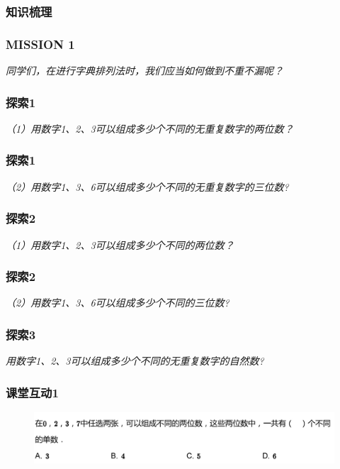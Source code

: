 \begin{frame}
    \frametitle{知识梳理}
\end{frame}

\begin{frame}
    \frametitle{MISSION 1}
    \vspace*{-2cm}
    \textit{同学们，在进行字典排列法时，我们应当如何做到不重不漏呢？}
\end{frame}

\begin{frame}
    \frametitle{探索1}
    \vspace*{-2cm}
    \textit{（1）用数字1、2、3可以组成多少个不同的无重复数字的两位数？}
\end{frame}

\begin{frame}
    \frametitle{探索1}
    \vspace*{-2cm}
    \textit{（2）用数字1、3、6可以组成多少个不同的无重复数字的三位数?}
\end{frame}

\begin{frame}
    \frametitle{探索2}
    \vspace*{-2cm}
    \textit{（1）用数字1、2、3可以组成多少个不同的两位数？}
\end{frame}

\begin{frame}
    \frametitle{探索2}
    \vspace*{-2cm}
    \textit{（2）用数字1、3、6可以组成多少个不同的三位数?}
\end{frame}

\begin{frame}
    \frametitle{探索3}
    \vspace*{-2cm}
    \textit{用数字1、2、3可以组成多少个不同的无重复数字的自然数?}
\end{frame}

\begin{frame}
    \frametitle{课堂互动1}
    \begin{figure}[H] 
        \centering
        \includegraphics[width=1\textwidth]{./pics/Chapter_2/ketanghudong1.png}
    \end{figure}
\end{frame}

